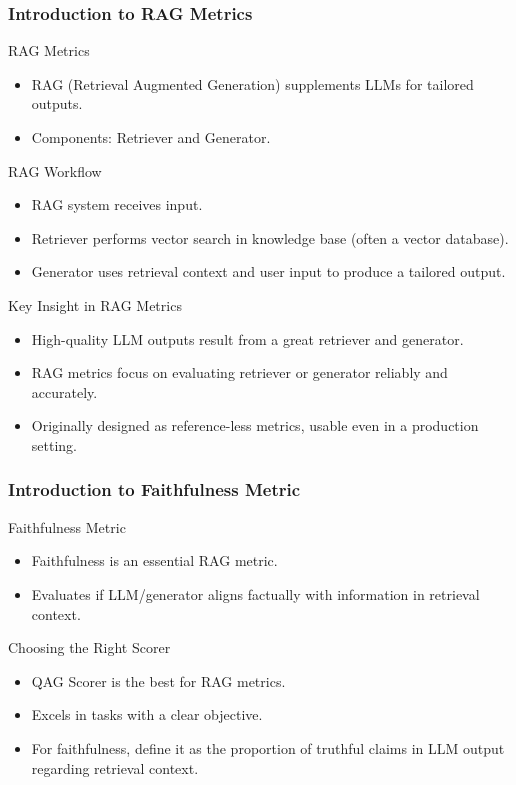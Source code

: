 \begin{frame}[fragile]\frametitle{Introduction to RAG Metrics}
RAG Metrics
  \begin{itemize}
    \item RAG (Retrieval Augmented Generation) supplements LLMs for tailored outputs.
    \item Components: Retriever and Generator.
  \end{itemize}

RAG Workflow
  \begin{itemize}
    \item RAG system receives input.
    \item Retriever performs vector search in knowledge base (often a vector database).
    \item Generator uses retrieval context and user input to produce a tailored output.
  \end{itemize}

Key Insight in RAG Metrics
  \begin{itemize}
    \item High-quality LLM outputs result from a great retriever and generator.
    \item RAG metrics focus on evaluating retriever or generator reliably and accurately.
    \item Originally designed as reference-less metrics, usable even in a production setting.
  \end{itemize}
\end{frame}

\begin{frame}[fragile]\frametitle{Introduction to Faithfulness Metric}
Faithfulness Metric
  \begin{itemize}
    \item Faithfulness is an essential RAG metric.
    \item Evaluates if LLM/generator aligns factually with information in retrieval context.
  \end{itemize}
  
Choosing the Right Scorer
  \begin{itemize}
    \item QAG Scorer is the best for RAG metrics.
    \item Excels in tasks with a clear objective.
    \item For faithfulness, define it as the proportion of truthful claims in LLM output regarding retrieval context.
  \end{itemize}
\end{frame}

